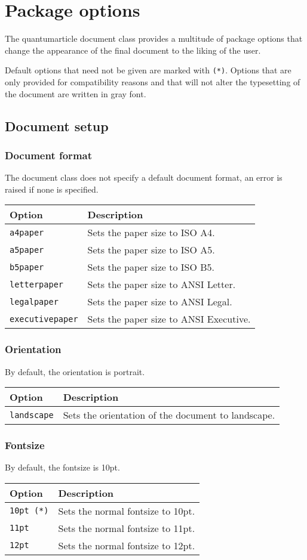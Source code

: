 \documentclass[a4paper,noarxiv,onecolumn]{quantumarticle}
\newenvironment{options}
	{\medskip\noindent\begin{longtable}{p{.20\columnwidth}p{.744\columnwidth}}
	\textsf{Option} & \textsf{Description} \\
	\midrule
	}
	{\bottomrule\end{longtable}}
\newcommand{\option}[2]{
	\small\texttt{#1} & {\small#2} \\
}
\newcommand{\defaultoption}[2]{
\small\texttt{#1 (*)} & {\small #2} \\
}
\begin{document}
	\section{Package options}
	The quantumarticle document class provides a multitude of package options that change the appearance of the final document to the liking of the user. 
	
	Default options that need not be given are marked with \texttt{(*)}. Options that are only provided for compatibility reasons and that will not alter the typesetting of the document are written in gray font.
	
	\subsection{Document setup}
	
	\subsubsection{Document format}
	The document class does not specify a default document format, an error is raised if none is specified.
	
	\begin{options}
		\option{a4paper}{
			Sets the paper size to ISO A4.
		}
		\option{a5paper}{
			Sets the paper size to ISO A5.
		}
		\option{b5paper}{
			Sets the paper size to ISO B5.
		}
		\option{letterpaper}{
			Sets the paper size to ANSI Letter.
		}
		\option{legalpaper}{
			Sets the paper size to ANSI Legal.
		}
		\option{executivepaper}{
			Sets the paper size to ANSI Executive.
		}
	\end{options}

	\subsubsection{Orientation}
	By default, the orientation is portrait. 
	
	\begin{options}
		\option{landscape}{
			Sets the orientation of the document to landscape.
		}
	\end{options}

	\subsubsection{Fontsize}
	By default, the fontsize is 10pt.
	
	\begin{options}
		\defaultoption{10pt}{
			Sets the normal fontsize to 10pt.
		}
		\option{11pt}{
			Sets the normal fontsize to 11pt.
		}
		\option{12pt}{
			Sets the normal fontsize to 12pt.
		}
	\end{options}
\end{document}
